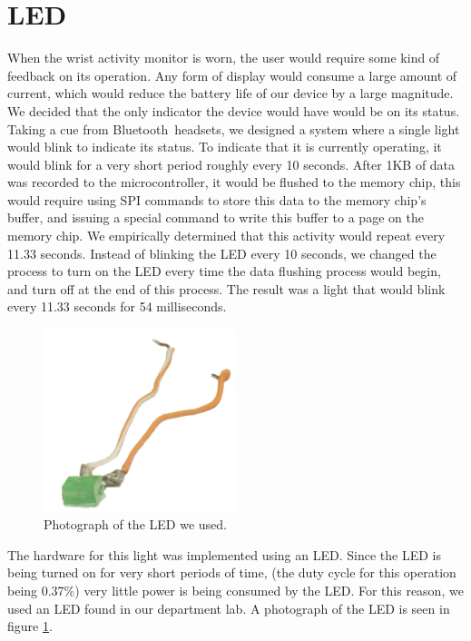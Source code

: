 \section{LED}
\label{Sec:LED}
When the wrist activity monitor is worn,
the user would require some kind of feedback on its operation.
Any form of display would consume a large amount of current,
which would reduce the battery life of our device by a large magnitude.
We decided that the only indicator the device would have would be on its status.
Taking a cue from Bluetooth\texttrademark ~headsets,
we designed a system where a single light would blink to indicate its status.
To indicate that it is currently operating, it would blink for a very short period roughly every 10 seconds.
After 1KB of data was recorded to the microcontroller, it would be flushed to the memory chip,
this would require using SPI commands to store this data to the memory chip's buffer,
and issuing a special command to write this buffer to a page on the memory chip.
We empirically determined that this activity would repeat every 11.33 seconds.
Instead of blinking the LED every 10 seconds, we changed the process to turn on the LED every time the data flushing process would begin,
and turn off at the end of this process.
The result was a light that would blink every 11.33 seconds for 54 milliseconds.
\begin{figure}
\begin{center}
\includegraphics[width=0.5\textwidth]{images/LEDPhoto.jpg}
\caption{Photograph of the LED we used.}
\label{Fig:LEDPHOTO}
\end{center}
\end{figure}
The hardware for this light was implemented using an LED.
Since the LED is being turned on for very short periods of time, 
(the duty cycle for this operation being 0.37\%) very little power is being consumed by the LED.
For this reason, we used an LED found in our department lab. A photograph of the LED is seen in figure \ref{Fig:LEDPHOTO}.

